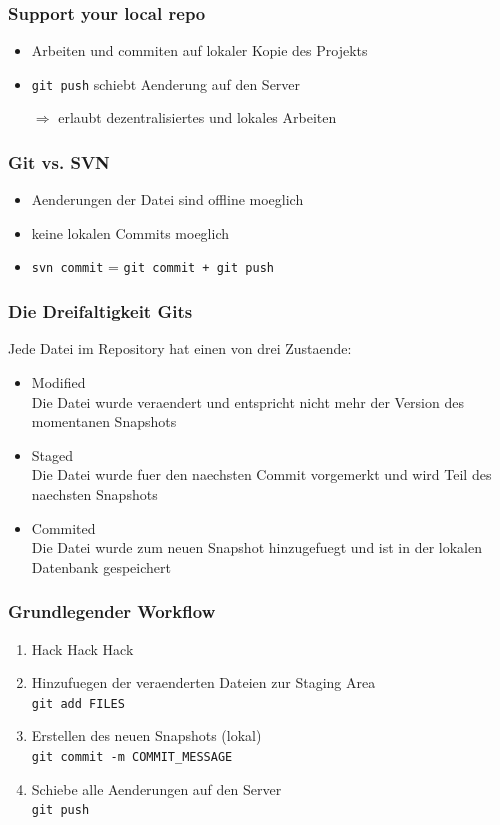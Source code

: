 \documentclass[12pt,utf8]{beamer}
\begin{document}
	\begin{frame}
		\frametitle{Support your local repo}
		\begin{itemize}
			\item Arbeiten und commiten auf lokaler Kopie des Projekts
			\item \texttt{git push} schiebt Aenderung auf den Server
			\item[$\Rightarrow$] erlaubt dezentralisiertes und lokales Arbeiten 
		\end{itemize}
	\end{frame}
	
	\begin{frame}
		\frametitle{Git vs. SVN}
		\begin{itemize}
			\item Aenderungen der Datei sind offline moeglich
			\item keine lokalen Commits moeglich
			\item \texttt{svn commit} = \texttt{git commit + git push}
		\end{itemize}
	\end{frame}

	\begin{frame}
		\frametitle{Die Dreifaltigkeit Gits}
		Jede Datei im Repository hat einen von drei Zustaende:
		\begin{itemize}
			\item Modified\\
				Die Datei wurde veraendert und entspricht nicht mehr der Version des momentanen Snapshots
			\item Staged\\
				Die Datei wurde fuer den naechsten Commit vorgemerkt und wird Teil des naechsten Snapshots
			\item Commited\\
				Die Datei wurde zum neuen Snapshot hinzugefuegt und ist in der lokalen Datenbank gespeichert
		\end{itemize}
	\end{frame}

	\begin{frame}
		\frametitle{Grundlegender Workflow}
		\begin{enumerate}
			\item Hack Hack Hack
			\item Hinzufuegen der veraenderten Dateien zur Staging Area\\
				\texttt{git add FILES}
			\item Erstellen des neuen Snapshots (lokal)\\
				\texttt{git commit -m COMMIT\_MESSAGE}
			\item Schiebe alle Aenderungen auf den Server\\
				\texttt{git push}
		\end{enumerate}
	\end{frame}
\end{document}
